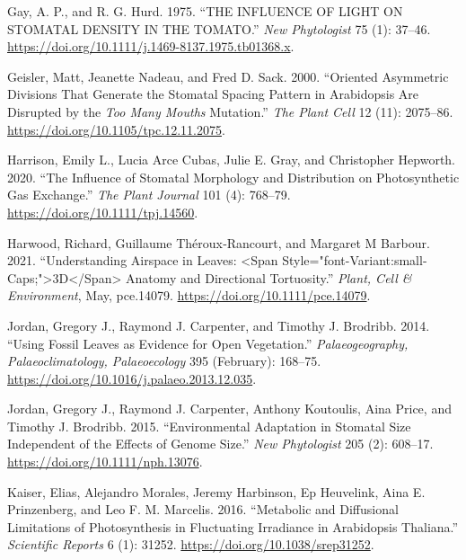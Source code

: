 \documentclass[12pt,halfline,a4paper,]{ouparticle}
\newlength{\cslhangindent}
\newlength{\cslentryspacingunit} %
\newenvironment{CSLReferences}[2] %
 {%
  \setlength{\parindent}{0pt}
  \ifodd #1
  \let\oldpar\par
  \def\par{\hangindent=\cslhangindent\oldpar}
  \fi
  \setlength{\parskip}{#2\cslentryspacingunit}
 }%
 {}
\begin{document}
\begin{CSLReferences}{1}{0}
\leavevmode{}%
Gay, A. P., and R. G. Hurd. 1975. {``{THE} {INFLUENCE} {OF} {LIGHT} {ON}
{STOMATAL} {DENSITY} {IN} {THE} {TOMATO}.''} \emph{New Phytologist} 75
(1): 37--46. \url{https://doi.org/10.1111/j.1469-8137.1975.tb01368.x}.

\leavevmode{}%
Geisler, Matt, Jeanette Nadeau, and Fred D. Sack. 2000. {``Oriented
{Asymmetric} {Divisions} {That} {Generate} the {Stomatal} {Spacing}
{Pattern} in {Arabidopsis} {Are} {Disrupted} by the \emph{Too Many
Mouths} {Mutation}.''} \emph{The Plant Cell} 12 (11): 2075--86.
\url{https://doi.org/10.1105/tpc.12.11.2075}.

\leavevmode{}%
Harrison, Emily L., Lucia Arce Cubas, Julie E. Gray, and Christopher
Hepworth. 2020. {``The Influence of Stomatal Morphology and Distribution
on Photosynthetic Gas Exchange.''} \emph{The Plant Journal} 101 (4):
768--79. \url{https://doi.org/10.1111/tpj.14560}.

\leavevmode{}%
Harwood, Richard, Guillaume Théroux‐Rancourt, and Margaret M Barbour.
2021. {``Understanding Airspace in Leaves: {\textless{}}Span
Style="font-Variant:small-Caps;"{\textgreater{}}{3D}{\textless{}}/Span{\textgreater{}}
Anatomy and Directional Tortuosity.''} \emph{Plant, Cell \&
Environment}, May, pce.14079. \url{https://doi.org/10.1111/pce.14079}.

\leavevmode{}%
Jordan, Gregory J., Raymond J. Carpenter, and Timothy J. Brodribb. 2014.
{``Using Fossil Leaves as Evidence for Open Vegetation.''}
\emph{Palaeogeography, Palaeoclimatology, Palaeoecology} 395 (February):
168--75. \url{https://doi.org/10.1016/j.palaeo.2013.12.035}.

\leavevmode{}%
Jordan, Gregory J., Raymond J. Carpenter, Anthony Koutoulis, Aina Price,
and Timothy J. Brodribb. 2015. {``Environmental Adaptation in Stomatal
Size Independent of the Effects of Genome Size.''} \emph{New
Phytologist} 205 (2): 608--17. \url{https://doi.org/10.1111/nph.13076}.

\leavevmode{}%
Kaiser, Elias, Alejandro Morales, Jeremy Harbinson, Ep Heuvelink, Aina
E. Prinzenberg, and Leo F. M. Marcelis. 2016. {``Metabolic and
Diffusional Limitations of Photosynthesis in Fluctuating Irradiance in
{Arabidopsis} Thaliana.''} \emph{Scientific Reports} 6 (1): 31252.
\url{https://doi.org/10.1038/srep31252}.


\end{CSLReferences}
\end{document}
